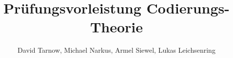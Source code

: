 \documentclass[12pt, titlepage]{article}
\begin{document}
	\begin{titlepage}
		\title{Prüfungsvorleistung Codierungs-Theorie}
		\author{David Tarnow, Michael Narkus, Armel Siewel, Lukas Leichsenring}
		\maketitle
		\tableofcontents
	\end{titlepage}

	
	
	
	
	
	
	
\end{document}
